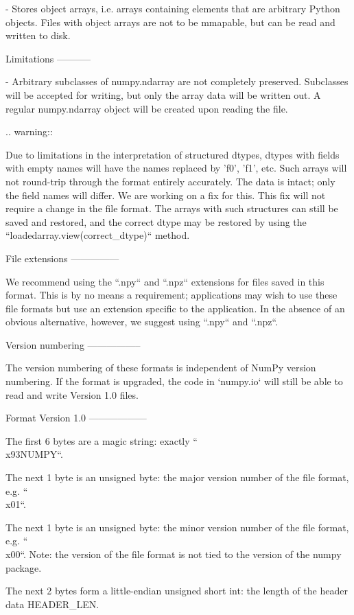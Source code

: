 \begin{DoxyVerb}
- Stores object arrays, i.e. arrays containing elements that are arbitrary
  Python objects. Files with object arrays are not to be mmapable, but
  can be read and written to disk.

Limitations
-----------

- Arbitrary subclasses of numpy.ndarray are not completely preserved.
  Subclasses will be accepted for writing, but only the array data will
  be written out. A regular numpy.ndarray object will be created
  upon reading the file.

.. warning::

  Due to limitations in the interpretation of structured dtypes, dtypes
  with fields with empty names will have the names replaced by 'f0', 'f1',
  etc. Such arrays will not round-trip through the format entirely
  accurately. The data is intact; only the field names will differ. We are
  working on a fix for this. This fix will not require a change in the
  file format. The arrays with such structures can still be saved and
  restored, and the correct dtype may be restored by using the
  ``loadedarray.view(correct_dtype)`` method.

File extensions
---------------

We recommend using the ``.npy`` and ``.npz`` extensions for files saved
in this format. This is by no means a requirement; applications may wish
to use these file formats but use an extension specific to the
application. In the absence of an obvious alternative, however,
we suggest using ``.npy`` and ``.npz``.

Version numbering
-----------------

The version numbering of these formats is independent of NumPy version
numbering. If the format is upgraded, the code in `numpy.io` will still
be able to read and write Version 1.0 files.

Format Version 1.0
------------------

The first 6 bytes are a magic string: exactly ``\\x93NUMPY``.

The next 1 byte is an unsigned byte: the major version number of the file
format, e.g. ``\\x01``.

The next 1 byte is an unsigned byte: the minor version number of the file
format, e.g. ``\\x00``. Note: the version of the file format is not tied
to the version of the numpy package.

The next 2 bytes form a little-endian unsigned short int: the length of
the header data HEADER_LEN.


\end{DoxyVerb}
